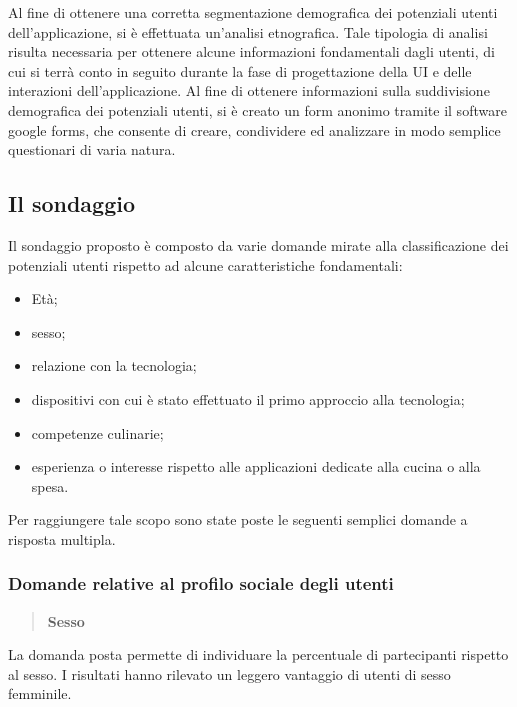 Al fine di ottenere una corretta segmentazione demografica dei potenziali utenti dell'applicazione, si è effettuata
un'analisi etnografica.
Tale tipologia di analisi risulta necessaria per ottenere 
alcune informazioni fondamentali dagli utenti, di cui si terrà conto in seguito durante la fase di progettazione della UI e delle interazioni 
dell'applicazione. Al fine di ottenere informazioni sulla suddivisione demografica dei potenziali utenti, si è creato
un form anonimo tramite il software google forms\cite{GoogleModules}, che consente di creare, condividere ed analizzare in modo semplice
questionari di varia natura.

\subsection{Il sondaggio}
Il sondaggio proposto è composto da varie domande mirate alla
classificazione dei potenziali utenti rispetto ad alcune caratteristiche
fondamentali:
\begin{itemize}
	\item Età;
	\item sesso;
	\item relazione con la tecnologia;
	\item dispositivi con cui è stato effettuato il primo approccio alla tecnologia;
	\item competenze culinarie;
	\item esperienza o interesse rispetto alle applicazioni dedicate alla cucina o alla spesa.
\end{itemize}

Per raggiungere tale scopo sono state poste le seguenti semplici domande a
risposta multipla.

\subsubsection{Domande relative al profilo sociale degli utenti}
\begin{quote}
	\textbf{Sesso}
\end{quote}
La domanda posta permette di individuare la percentuale di partecipanti rispetto 
al sesso.  I risultati hanno rilevato un leggero vantaggio di utenti
di sesso femminile.

